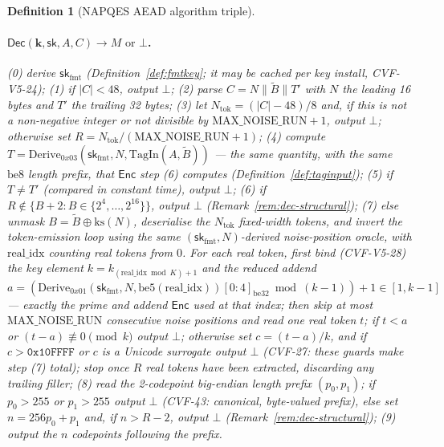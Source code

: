 \documentclass[11pt,a4paper]{article}
\newtheorem{definition}[theorem]{Definition}
\begin{document}
\begin{definition}[NAPQES AEAD algorithm triple]
\paragraph{$\mathsf{Dec}(\mathbf{k}, \mathsf{sk}, A, C) \to M \text{ or } \bot$.}
(0) derive $\mathsf{sk}_{\mathrm{fmt}}$ (Definition~\ref{def:fmtkey}; it
may be cached per key install, CVF-V5-24); (1) if $|C|<48$, output $\bot$; (2) parse $C=N\|\widetilde{B}\|T'$ with $N$
the leading 16 bytes and $T'$ the trailing 32 bytes; (3) let
$N_{\mathrm{tok}}=(|C|-48)/8$ and, if this is not a non-negative integer or
not divisible by $\mathrm{MAX\_NOISE\_RUN}+1$, output $\bot$; otherwise set
$R=N_{\mathrm{tok}}/(\mathrm{MAX\_NOISE\_RUN}+1)$; (4) compute
$T=\mathrm{Derive}_{0x03}(\mathsf{sk}_{\mathrm{fmt}},N,\mathrm{TagIn}(A,\widetilde{B}))$
— the same quantity, with the same $\mathrm{be8}$ length prefix, that
$\mathsf{Enc}$ step (6) computes (Definition~\ref{def:taginput});
(5) if $T\neq T'$ (compared in constant time), output $\bot$;
(6) if $R\notin\{B+2 : B\in\{2^4,\ldots,2^{16}\}\}$, output $\bot$
(Remark~\ref{rem:dec-structural});
(7) else unmask $B=\widetilde{B}\oplus\mathrm{ks}(N)$, deserialise the
$N_{\mathrm{tok}}$ fixed-width tokens, and invert the token-emission loop
using the same $(\mathsf{sk}_{\mathrm{fmt}},N)$-derived noise-position oracle,
with $\mathrm{real\_idx}$ counting real tokens from $0$. For each real
token, first bind (CVF-V5-28) the key element
$k=k_{(\mathrm{real\_idx}\bmod K)+1}$ and the \emph{reduced} addend
$a=(\mathrm{Derive}_{0x01}(\mathsf{sk}_{\mathrm{fmt}},N,\mathrm{be5}(\mathrm{real\_idx}))[0{:}4]_{\mathrm{be32}}\bmod(k-1))+1\in[1,k-1]$
— exactly the prime and addend $\mathsf{Enc}$ used at that index; then skip
at most $\mathrm{MAX\_NOISE\_RUN}$ consecutive noise positions and read one
real token $t$; if $t<a$ or $(t-a)\not\equiv 0\pmod{k}$ output $\bot$;
otherwise set $c=(t-a)/k$, and if $c>\mathtt{0x10FFFF}$ or $c$ is a Unicode
surrogate output $\bot$ (CVF-27: these guards make step (7) total); stop
once $R$ real tokens have been extracted, discarding any trailing filler; (8) read the 2-codepoint
big-endian length prefix $(p_0,p_1)$; if $p_0>255$ or $p_1>255$ output
$\bot$ (CVF-43: canonical, byte-valued prefix), else set $n=256p_0+p_1$
and, if $n>R-2$, output $\bot$
(Remark~\ref{rem:dec-structural}); (9) output the $n$ codepoints following
the prefix.
\end{definition}
\end{document}
